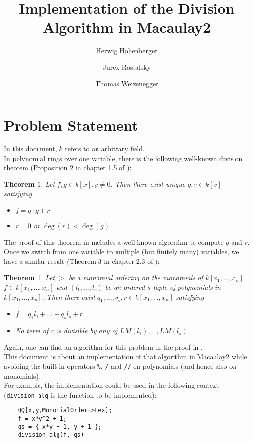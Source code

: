 \documentclass[a4paper,article,math]{extarticle}
\title{Implementation of the Division Algorithm in Macaulay2}
\author{Herwig Höhenberger \and Jurek Rostalsky \and Thomas Weizenegger}
\newtheorem{thm}[defi]{Theorem}
\newcommand{\kx}{k[x_1, \dots, x_n]}
\begin{document}
\maketitle
\section{Problem Statement}
In this document, $k$ refers to an arbitrary field.\\
In polynomial rings over one variable, there is the following well-known division theorem
(Proposition 2 in chapter 1.5 of \cite{cox-2013}):
\begin{thm}
	Let $f, g \in k[x], g \neq 0$.
	Then there exist unique $q, r \in k[x]$ satisfying
	\begin{itemize}
		\item $f = q \cdot g + r$
		\item $r=0$ or $\deg(r) < \deg(g)$
	\end{itemize}
\end{thm}
The proof of this theorem in \cite{cox-2013} includes a well-known algorithm to compute $q$ and $r$.\\
Once we switch from one variable to multiple (but finitely many) variables, we have a similar result
(Theorem 3 in chapter 2.3 of \cite{cox-2013}):
\begin{thm}
	Let $>$ be a monomial ordering on the monomials of $\kx$, $f \in \kx$
	and $(l_1, \dots, l_s)$ be an ordered $s$-tuple of polynomials in $\kx$.
	Then there exist $q_1, \dots, q_s, r \in \kx$ satisfying
	\begin{itemize}
		\item $f = q_1l_1 + \dots + q_sl_s + r$
		\item No term of $r$ is divisible by any of $LM(l_1), \dots, LM(l_s)$
	\end{itemize}
\end{thm}
Again, one can find an algorithm for this problem in the proof in \cite{cox-2013}.\\
This document is about an implementation of that algorithm in Macaulay2
while avoiding the built-in operators \texttt{\%}, \texttt{/} and \texttt{//} on polynomials (and hence also on monomials).\\
For example, the implementation could be used in the following context (\texttt{division\_alg} is the function to be implemented):
\begin{lstlisting}
	QQ[x,y,MonomialOrder=>Lex];
	f = x*y^2 + 1;
	gs = { x*y + 1, y + 1 };
	division_alg(f, gs)
\end{lstlisting}
\end{document}

